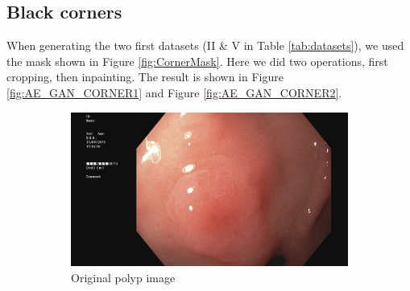 \FloatBarrier
\subsection{Black corners}
When generating the two first datasets (II \& V in Table \ref{tab:datasets}), we used the mask shown in Figure \ref{fig:CornerMask}. Here we did two operations, first cropping, then inpainting. The result is shown in Figure \ref{fig:AE_GAN_CORNER1} and Figure \ref{fig:AE_GAN_CORNER2}.

\begin{figure}
        \tiny
        \begin{subfigure}[t]{\myfigsizethree}
            \centering
            \includegraphics[height=\textwidth, width=\textwidth]{experiments/figures/blackcorner/polypORIG.jpg}
            \caption{Original polyp image }    
            \label{fig:polyp_ORIG_CORNER1}
        \end{subfigure}
        \qquad
        \begin{subfigure}[t]{\myfigsizethree}
            \centering

\end{subfigure}
\end{figure}
